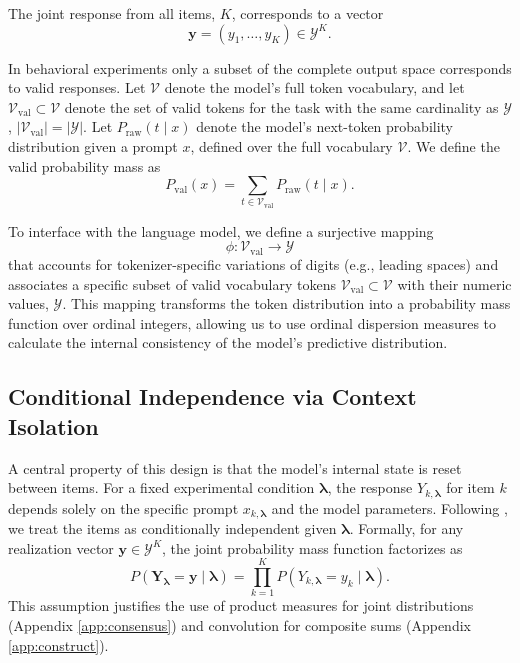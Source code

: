 The joint response from all items, $K$, corresponds to a vector 
\begin{equation}
    \label{eq:y-vector}
    \mathbf{y} = (y_1, \dots, y_K) \in \mathcal{Y}^K.
\end{equation}

In behavioral experiments only a subset of the complete output space
corresponds to valid responses. 
Let $\mathcal{V}$ denote the model's full token vocabulary, and let $\mathcal{V}_{\text{val}} \subset {\mathcal{V}}$ denote the set of valid tokens for the task {with the same cardinality as $\mathcal{Y}$, $|\mathcal{V}_{\text{val}}|=|\mathcal{Y}|$}. 
Let $P_{\text{raw}}(t \mid x)$ denote the model's next-token probability distribution given a prompt $x$, defined over the full vocabulary {$\mathcal{V}$}. We define the valid probability mass as
\begin{equation}
    P_{\text{val}}(x) = \sum_{t \in \mathcal{V}_{\text{val}}} P_{\text{raw}}(t \mid x).    
\end{equation}

To interface with the language model, we define a surjective mapping 
\begin{equation}
    \label{eq:phi}
\phi: \mathcal{V}_{\text{val}} \to \mathcal{Y}    
\end{equation}
that accounts for tokenizer-specific variations of digits (e.g., leading spaces) and associates a specific subset of valid vocabulary tokens $\mathcal{V}_{\text{val}} \subset {\mathcal{V}}$ with their numeric values, $\mathcal{Y}$.
This mapping transforms the token distribution into a probability mass function over ordinal integers, allowing us to use ordinal dispersion measures to calculate the internal consistency of the model's predictive distribution.

\subsection{Conditional Independence via Context Isolation}
\label{sec:independence-assumption}

A central property of this design is that the model's internal state is reset between items. For a fixed experimental condition $\boldsymbol{\lambda}$, the response $Y_{k,\boldsymbol{\lambda}}$ for item $k$ depends solely on the specific prompt $x_{k,\boldsymbol{\lambda}}$ and the model parameters. 
Following \citet{wadi2025a}, we treat the items as conditionally independent given $\boldsymbol{\lambda}$.
Formally, for any realization vector $\mathbf{y} \in \mathcal{Y}^K$, the joint probability mass function factorizes as
\begin{equation}
\label{eq:joint-distribution-app}
    P(\mathbf{Y}_{\boldsymbol{\lambda}} = \mathbf{y} \mid \boldsymbol{\lambda}) = \prod_{k=1}^{K} P(Y_{k,\boldsymbol{\lambda}} = y_k \mid \boldsymbol{\lambda}).
\end{equation}
This assumption justifies the use of product measures for joint distributions (Appendix \ref{app:consensus}) and convolution for composite sums (Appendix \ref{app:construct}).

